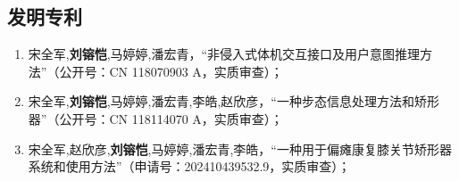 \begin{publications}
\section*{发明专利}
\begin{enumerate}
\item 宋全军,\textbf{刘镕恺},马婷婷,潘宏青，“非侵入式体机交互接口及用户意图推理方法”（公开号：CN 118070903 A，实质审查）；
\item 宋全军,\textbf{刘镕恺},马婷婷,潘宏青,李皓,赵欣彦，“一种步态信息处理方法和矫形器”（公开号：CN 118114070 A，实质审查）；
\item 宋全军,赵欣彦,\textbf{刘镕恺},马婷婷,潘宏青,李皓，“一种用于偏瘫康复膝关节矫形器系统和使用方法”（申请号：202410439532.9，实质审查）；
\end{enumerate}


\end{publications}
